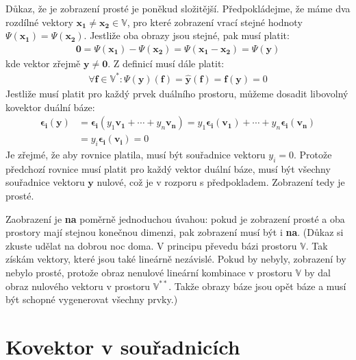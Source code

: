 \documentclass[a5paper,12pt]{amsbook}
\theoremstyle{definition}
\newcommand{\myvec}[1]{\bm{#1}}
\newcommand{\myspace}[1]{\mathbb{#1}}
\newcommand{\mydual}[1]{\myspace{#1^{*}}}
\newcommand{\mydouble}[1]{\myspace{#1^{**}}}
\newcommand{\mycocovec}[1]{\mathbf{\widehat{#1}}}
\begin{document}
\medskip\noindent
Důkaz, že je zobrazení prosté je poněkud složitější. Předpokládejme, že máme dva rozdílné vektory
$\myvec{x_1}\neq\myvec{x_2}\in\myspace{V}$, pro které zobrazení vrací stejné hodnoty
$\Psi(\myvec{x_1}) = \Psi(\myvec{x_2})$. Jestliže oba obrazy jsou stejné, pak musí platit:
\begin{equation*}
\begin{split}
\myvec{0} = \Psi(\myvec{x_1}) - \Psi(\myvec{x_2}) = \Psi(\myvec{x_1} - \myvec{x_2}) = \Psi(\myvec{y})
\end{split}
\end{equation*}
kde vektor zřejmě $\myvec{y}\neq\myvec{0}$. Z definicí musí dále platit:
\begin{equation*}
\begin{split}
\forall \myvec{f}\in\mydual{V}: \Psi(\myvec{y})(\myvec{f}) = \mycocovec{y}(\myvec{f}) 
    = \myvec{f}(\myvec{y}) = 0
\end{split}
\end{equation*}
Jestliže musí platit pro každý prvek duálního prostoru, můžeme dosadit libovolný kovektor
duální báze:
\begin{equation*}
\begin{split}
\myvec{\epsilon_i}(\myvec{y}) &= \myvec{\epsilon_i}(y_{1}\myvec{v_1} + \cdots + y_{n}\myvec{v_n})
    = y_{1}\myvec{\epsilon_i}(\myvec{v_1}) + \cdots + y_{n}\myvec{\epsilon_i}(\myvec{v_n}) \\
    &= y_{i}\myvec{\epsilon_i}(\myvec{v_i}) = 0
\end{split}
\end{equation*}
Je zřejmé, že aby rovnice platila, musí být souřadnice vektoru $y_i = 0$. Protože předchozí rovnice
musí platit pro každý vektor duální báze, musí být všechny souřadnice vektoru $\myvec{y}$ nulové,
což je v rozporu s předpokladem. Zobrazení tedy je prosté.

\medskip\noindent
Zaobrazení je \textbf{na} poměrně jednoduchou úvahou: pokud je zobrazení prosté a oba prostory
mají stejnou konečnou dimenzi, pak zobrazení musí být i \textbf{na}. (Důkaz si zkuste udělat
na dobrou noc doma. V principu převedu bázi prostoru $\myspace{V}$. Tak získám vektory, které
jsou také lineárně nezávislé. Pokud by nebyly, zobrazení by nebylo prosté, protože obraz
nenulové lineární kombinace v prostoru $\myspace{V}$ by dal obraz nulového vektoru v prostoru
$\mydouble{V}$. Takže obrazy báze jsou opět báze a musí být schopné vygenerovat všechny prvky.)

\section{Kovektor v souřadnicích}
\end{document}
